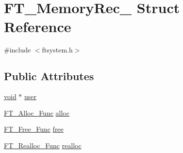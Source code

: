 \hypertarget{struct_f_t___memory_rec__}{\section{F\-T\-\_\-\-Memory\-Rec\-\_\- Struct Reference}
\label{struct_f_t___memory_rec__}
}


{\ttfamily \#include $<$ftsystem.\-h$>$}

\subsection*{Public Attributes}
\begin{DoxyCompactItemize}
\item 
\hyperlink{wglew_8h_aeea6e3dfae3acf232096f57d2d57f084}{void} $\ast$ \hyperlink{struct_f_t___memory_rec___aae5bc614434ba4525e37d7faaf03c4b7}{user}
\item 
\hyperlink{ftsystem_8h_a039b55a7c519225d979f180ce609c552}{F\-T\-\_\-\-Alloc\-\_\-\-Func} \hyperlink{struct_f_t___memory_rec___a2269eada6afbb008fe5c73707145410c}{alloc}
\item 
\hyperlink{ftsystem_8h_ab963fd1f3ae6c1b251191360c769ad17}{F\-T\-\_\-\-Free\-\_\-\-Func} \hyperlink{struct_f_t___memory_rec___a83ab2422bd9265d8731b9e5e368ba240}{free}
\item 
\hyperlink{ftsystem_8h_abbec55b4fe338ca28fc673b5048840a2}{F\-T\-\_\-\-Realloc\-\_\-\-Func} \hyperlink{struct_f_t___memory_rec___a5ce3424cc72e898fe973ffeabe44a95c}{realloc}
\end{DoxyCompactItemize}


